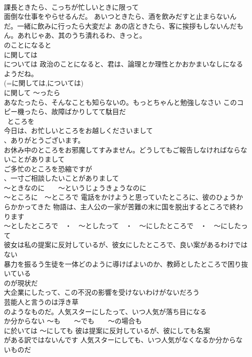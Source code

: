 \documentclass[8pt]{extreport}
\begin{document}
\begin{CJK}{UTF8}{min}
\\	課長ときたら、こっちが忙しいときに限って
\\	面倒な仕事をやらせるんだ。 あいつときたら、酒を飲みだすと止まらないんだ。一緒に飲みに行ったら大変だよ あの店ときたら、客に挨拶もしないんだもん。あれじゃあ、其のうち潰れるわ、きっと。	
\\	のことになると　
\\	に関しては 
\\	については 政治のことになると、君は、論理とか理性とかおかまいなしになるようだね。 
\\	(=に関しては,については) 
\\	に関して ～ったら 
\\	あなたったら、そんなことも知らないの。もっとちゃんと勉強しなさい このコピー機ったら、故障ばかりしてて駄目だ
\\	~ところを 
\\	今日は、お忙しいところをお越しくださいまして
\\	、ありがとうございます。 
\\	お休み中のところをお邪魔してすみません。どうしてもご報告しなければならないことがありまして 
\\	ご多忙のところを恐縮ですが
\\	、一寸ご相談したいことがありまして 
\\	～ときなのに　　～というじょうきょうなのに 
\\	～ところに　～ところで 電話をかけようと思っていたところに、彼のひょうからかかってきた 物語は、主人公の一家が苦難の末に国を脱出するところで終わります
\\	～としたところで　・　～としたって　・　～にしたところで　・　～にしたって 
\\	彼女は私の提案に反対しているが、彼女にしたところで、良い案があるわけではない 
\\	暴力を振るう生徒を一体どのように導けばよいのか、教師としたところで困り抜いている
\\	のが現状だ
\\	大企業にしたって、この不況の影響を受けないわけがないだろう 
\\	芸能人と言うのは浮き草
\\	のようなものだ。人気スターにしたって、いつ人気が落ち目になる
\\	か分からない	～も　　～でも　　～の場合も 
\\	に於いては ～にしても 彼は提案に反対しているが、彼にしても名案
\\	がある訳ではないんです 人気スターにしても、いつ人気がなくなるか分からないものだ 

\end{CJK}
\end{document}
